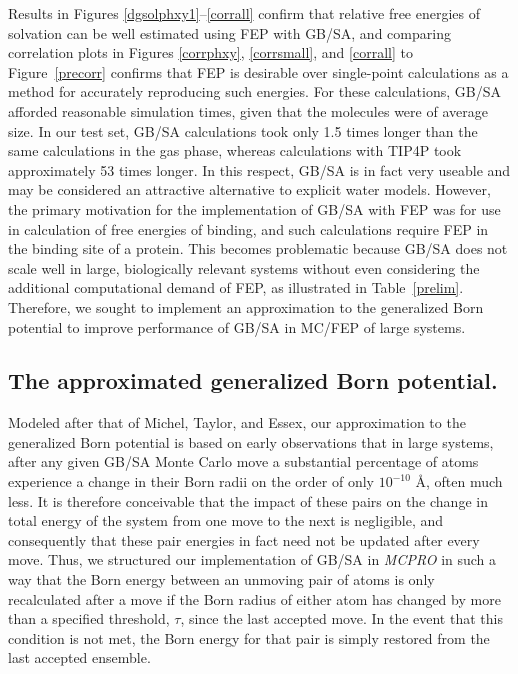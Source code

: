 \documentclass[12pt]{report}
\def\tablab{Table}\def\tabslab{\tablab s}
\def\figlab{Figure}\def\figslab{\figlab s}
\newcommand*\tbl[1]{\tablab~\ref{#1}}
\newcommand*\fig[1]{\figlab~\ref{#1}}
\begin{document}
Results in Figures \ref{dgsolphxy1}--\ref{corrall} confirm that relative free energies of solvation can be well estimated using FEP with GB/SA, and comparing correlation plots in Figures \ref{corrphxy}, \ref{corrsmall}, and \ref{corrall} to \fig{precorr} confirms that FEP is desirable over single-point calculations as a method for accurately reproducing such energies. For these calculations, GB/SA afforded reasonable simulation times, given that the molecules were of average size. In our test set, GB/SA calculations took only 1.5 times longer than the same calculations in the gas phase, whereas calculations with TIP4P took approximately 53 times longer. In this respect, GB/SA is in fact very useable and may be considered an attractive alternative to explicit water models. However, the primary motivation for the implementation of GB/SA with FEP was for use in calculation of free energies of binding, and such calculations require FEP in the binding site of a protein. This becomes problematic because GB/SA does not scale well in large, biologically relevant systems without even considering the additional computational demand of FEP, as illustrated in \tbl{prelim}. Therefore, we sought to implement an approximation to the generalized Born potential to improve performance of GB/SA in MC/FEP of large systems.


\subsection{The approximated generalized Born potential.}

Modeled after that of Michel, Taylor, and Essex, \cite{michel4} our approximation to the generalized Born potential is based on early observations that in large systems, after any given GB/SA Monte Carlo move a substantial percentage of atoms experience a change in their Born radii on the order of only $10^{-10}$ \AA, often much less. It is therefore conceivable that the impact of these pairs on the change in total energy of the system from one move to the next is negligible, and consequently that these pair energies in fact need not be updated after every move. Thus, we structured our implementation of GB/SA in \textit{MCPRO} in such a way that the Born energy between an unmoving pair of atoms is only recalculated after a move if the Born radius of either atom has changed by more than a specified threshold, $\tau$, since the last accepted move. In the event that this condition is not met, the Born energy for that pair is simply restored from the last accepted ensemble.
\end{document}
